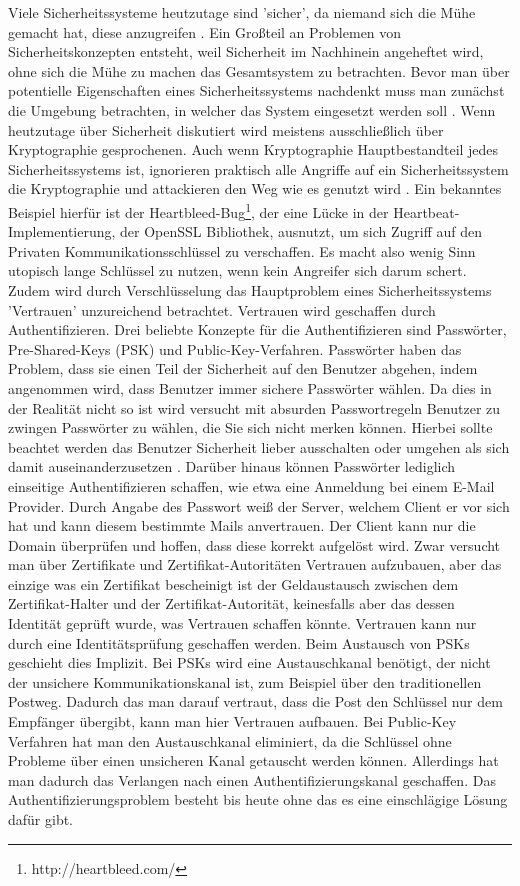 \documentclass[11pt,a4paper]{report}
\begin{document}
Viele Sicherheitssysteme heutzutage sind 'sicher', da niemand sich die Mühe gemacht hat, diese anzugreifen \cite{gutmann0}. Ein Großteil an Problemen von Sicherheitskonzepten entsteht, weil Sicherheit im Nachhinein angeheftet wird, ohne sich die Mühe zu machen das Gesamtsystem zu betrachten. Bevor man über potentielle Eigenschaften eines Sicherheitssystems nachdenkt muss man zunächst die Umgebung betrachten, in welcher das System eingesetzt werden soll \cite{gutmann4}. Wenn heutzutage über Sicherheit diskutiert wird meistens ausschließlich über Kryptographie gesprochenen. Auch wenn Kryptographie Hauptbestandteil jedes Sicherheitssystems ist, ignorieren praktisch alle Angriffe auf ein Sicherheitssystem die Kryptographie und attackieren den Weg wie es genutzt wird \cite{gutmann1}. Ein bekanntes Beispiel hierfür ist der Heartbleed-Bug\footnote{http://heartbleed.com/}, der eine Lücke in der Heartbeat-Implementierung, der OpenSSL Bibliothek, ausnutzt, um sich Zugriff auf den Privaten Kommunikationsschlüssel zu verschaffen. Es macht also wenig Sinn utopisch lange Schlüssel zu nutzen, wenn kein Angreifer sich darum schert. Zudem wird durch Verschlüsselung das Hauptproblem eines Sicherheitssystems 'Vertrauen' unzureichend betrachtet. Vertrauen wird geschaffen durch Authentifizieren. Drei beliebte Konzepte für die Authentifizieren sind Passwörter, Pre-Shared-Keys (PSK) und Public-Key-Verfahren. Passwörter haben das Problem, dass sie einen Teil der Sicherheit auf den Benutzer abgehen, indem angenommen wird, dass Benutzer immer sichere Passwörter wählen. Da dies in der Realität nicht so ist wird versucht mit absurden Passwortregeln Benutzer zu zwingen Passwörter zu wählen, die Sie sich nicht merken können. Hierbei sollte beachtet werden das Benutzer Sicherheit lieber ausschalten oder umgehen als sich damit auseinanderzusetzen \cite{gutmann5}. Darüber hinaus können Passwörter lediglich einseitige Authentifizieren schaffen, wie etwa eine Anmeldung bei einem E-Mail Provider. Durch Angabe des Passwort weiß der Server, welchem Client er vor sich hat und kann diesem bestimmte Mails anvertrauen. Der Client kann nur die Domain überprüfen und hoffen, dass diese korrekt aufgelöst wird. Zwar versucht man über Zertifikate und Zertifikat-Autoritäten Vertrauen aufzubauen, aber das einzige was ein Zertifikat bescheinigt ist der Geldaustausch zwischen dem Zertifikat-Halter und der Zertifikat-Autorität, keinesfalls aber das dessen Identität geprüft wurde, was Vertrauen schaffen könnte. Vertrauen kann nur durch eine Identitätsprüfung geschaffen werden. Beim Austausch von PSKs geschieht dies Implizit. Bei PSKs wird eine Austauschkanal benötigt, der nicht der unsichere Kommunikationskanal ist, zum Beispiel über den traditionellen Postweg. Dadurch das man darauf vertraut, dass die Post den Schlüssel nur dem Empfänger übergibt, kann man hier Vertrauen aufbauen. Bei Public-Key Verfahren hat man den Austauschkanal eliminiert, da die Schlüssel ohne Probleme über einen unsicheren Kanal getauscht werden können. Allerdings hat man dadurch das Verlangen nach einen Authentifizierungskanal geschaffen. Das Authentifizierungsproblem besteht bis heute ohne das es eine einschlägige Lösung dafür gibt. 
\end{document}
